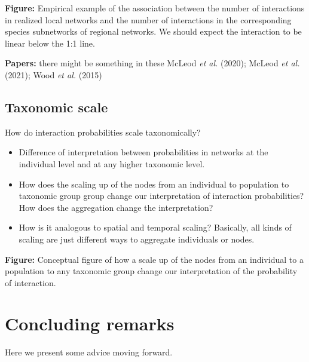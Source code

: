 \documentclass[10pt,oneside]{article}
\begin{document}
\textbf{Figure:} Empirical example of the association between the number
of interactions in realized local networks and the number of
interactions in the corresponding species subnetworks of regional
networks. We should expect the interaction to be linear below the 1:1
line.

\textbf{Papers:} there might be something in these McLeod \emph{et al.}
(2020); McLeod \emph{et al.} (2021); Wood \emph{et al.} (2015)

\hypertarget{taxonomic-scale}{%
\subsection{Taxonomic scale}\label{taxonomic-scale}}

How do interaction probabilities scale taxonomically?

\begin{itemize}
\tightlist
\item
  Difference of interpretation between probabilities in networks at the
  individual level and at any higher taxonomic level.
\item
  How does the scaling up of the nodes from an individual to population
  to taxonomic group group change our interpretation of interaction
  probabilities? How does the aggregation change the interpretation?
\item
  How is it analogous to spatial and temporal scaling? Basically, all
  kinds of scaling are just different ways to aggregate individuals or
  nodes.
\end{itemize}

\textbf{Figure:} Conceptual figure of how a scale up of the nodes from
an individual to a population to any taxonomic group change our
interpretation of the probability of interaction.

\hypertarget{concluding-remarks}{%
\section{Concluding remarks}\label{concluding-remarks}}

Here we present some advice moving forward.
\end{document}
